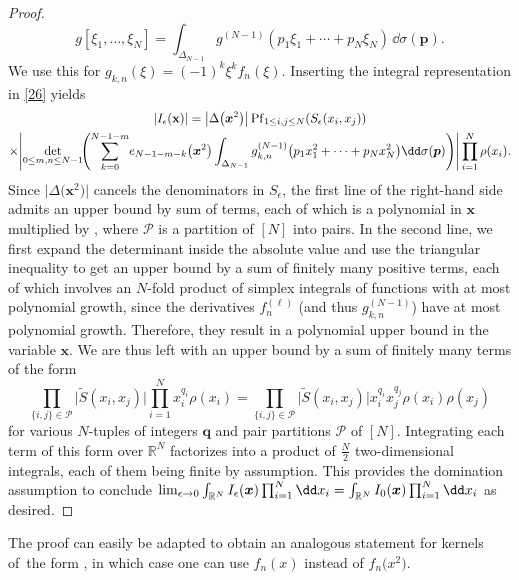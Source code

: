 \begin{proof}
\[
g[\xi_1,\dots,\xi_N] = \int_{\Delta_{N - 1}} g^{(N - 1)}(p_1\xi_1 + \cdots + p_N\xi_N)\,\dd \sigma(\boldsymbol{p}).
\]
We use this for $g_{k,n}(\xi) = (-1)^{k}\xi^k f_n(\xi)$. Inserting the integral representation in \eqref{26} yields
\begin{gather*}
|I_{\epsilon}(\mathbf{x})| = \bigl|\Delta\bigl(\boldsymbol{x}^2\bigr)\bigr| \operatorname{Pf}_{1 \leq i,j \leq N}(S_{\epsilon}(x_i,x_j) ) \\
 \times \Biggl| \mathop{{\rm det}}_{0 \leq m,n \leq N - 1}\!\Biggl( \sum_{k = 0}^{N - 1 - m}\! e_{N - 1 - m - k}\bigl(\boldsymbol{x}^2\bigr) \int_{\Delta_{N - 1}} g_{k,n}^{(N - 1)}\bigl(p_1x_1^2 + \cdots + p_N x_N^2\bigr) \dd \sigma(\boldsymbol{p})\Biggr)\Biggr| \prod_{i = 1}^N \rho(x_i).
\end{gather*}
Since $\bigl|\Delta\bigl(\boldsymbol{x}^2\bigr)\bigr|$ cancels the denominators in $S_{\epsilon}$, the first line of the right-hand side admits an upper bound
by sum of terms, each of which is a polynomial in $\boldsymbol{x}$ multiplied by , where $\mathcal{P}$ is a partition of $[N]$ into pairs. In the second line, we first expand the determinant inside the absolute value and use the triangular inequality to get an upper bound by a sum of finitely many positive terms, each of which involves an $N$-fold product of simplex integrals of functions with at most polynomial growth, since the derivatives $f_{n}^{(\ell)}$ \big(and thus $g_{k,n}^{(N - 1)}$\big) have at most polynomial growth. Therefore, they result in a polynomial upper bound in the variable $\boldsymbol{x}$. We are thus left with an upper bound by a sum of finitely many terms of the form
\[
\prod_{\{i,j\} \in \mathcal{P}} \bigl|\tilde{S}(x_i,x_j)\bigr| \prod_{i = 1}^{N} x_i^{q_i}\rho(x_i) = \prod_{\{i,j\} \in \mathcal{P}} \bigl|\tilde{S}(x_i,x_j)\bigr|x_i^{q_i}x_j^{q_j} \rho(x_i)\rho(x_j)
\]
for various $N$-tuples of integers $\boldsymbol{q}$ and pair partitions $\mathcal{P}$ of $[N]$. Integrating each term of this form over $\mathbb{R}^{N}$ factorizes into a product of $\frac{N}{2}$ two-dimensional integrals, each of them being finite by assumption. This provides the domination assumption to conclude $\smash{\lim_{\epsilon \rightarrow 0} \int_{\mathbb{R}^N} I_{\epsilon}(\boldsymbol{x}) \prod_{i = 1}^N \dd x_i} = \smash{\int_{\mathbb{R}^N} I_0(\boldsymbol{x}) \prod_{i = 1}^N \dd x_i}$ as desired.
\end{proof}

\begin{Remark}
\label{therem} The proof can easily be adapted to obtain an analogous statement for kernels of~the form , in which case one can use $f_n(x)$ instead of $f_n\bigl(x^2\bigr)$.
\end{Remark}

